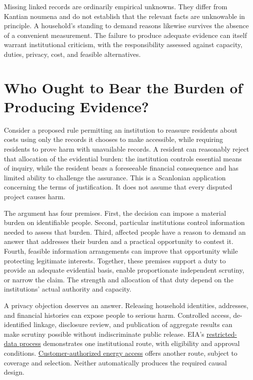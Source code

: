 Missing linked records are ordinarily empirical unknowns. They differ
from Kantian noumena and do not establish that the relevant facts are
unknowable in principle. A household's standing to demand reasons
likewise survives the absence of a convenient measurement. The failure
to produce adequate evidence can itself warrant institutional criticism,
with the responsibility assessed against capacity, duties, privacy,
cost, and feasible alternatives.


\hypertarget{M09-who-ought-to-bear-the-burden-of-producing-evidence}{%
\section{Who Ought to Bear the Burden of Producing
Evidence?}\label{M09-who-ought-to-bear-the-burden-of-producing-evidence}}

\noindent \noindent Consider a proposed rule permitting an institution to reassure
residents about costs using only the records it chooses to make
accessible, while requiring residents to prove harm with unavailable
records. A resident can reasonably reject that allocation of the
evidential burden: the institution controls essential means of inquiry,
while the resident bears a foreseeable financial consequence and has
limited ability to challenge the assurance. This is a Scanlonian
application concerning the terms of justification. It does not assume
that every disputed project causes harm.

The argument has four premises. First, the decision can impose a
material burden on identifiable people. Second, particular institutions
control information needed to assess that burden. Third, affected people
have a reason to demand an answer that addresses their burden and a
practical opportunity to contest it. Fourth, feasible information
arrangements can improve that opportunity while protecting legitimate
interests. Together, these premises support a duty to provide an
adequate evidential basis, enable proportionate independent scrutiny, or
narrow the claim. The strength and allocation of that duty depend on the
institutions' actual authority and capacity.

A privacy objection deserves an answer. Releasing household identities,
addresses, and financial histories can expose people to serious harm.
Controlled access, de-identified linkage, disclosure review, and
publication of aggregate results can make scrutiny possible without
indiscriminate public release. EIA's
\href{https://www.eia.gov/about/cipsea_reporting.php}{restricted-data
process} demonstrates one institutional route, with eligibility and
approval conditions.
\href{https://www.energy.gov/data/green-button}{Customer-authorized
energy access} offers another route, subject to coverage and selection.
Neither automatically produces the required causal design.

